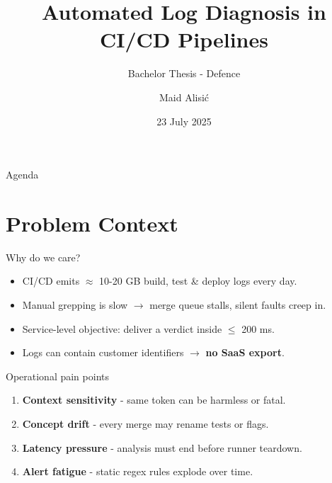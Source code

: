 \documentclass[14pt,aspectratio=169]{beamer}
\title{Automated Log Diagnosis in CI/CD Pipelines}
\subtitle{Bachelor Thesis - Defence}
\author{Maid Alisi\'c}
\institute{University of Applied Sciences Upper Austria}
\date{23 July 2025}
\begin{document}

\maketitle

\begin{frame}{Agenda}
\tableofcontents[
  hideallsubsections,
  sections={1,...,9}
]
\end{frame}

\section{Problem Context}
\begin{frame}{Why do we care?}
\begin{itemize}[<+->]
  \item CI/CD emits \alert{$\approx$ 10-20 GB} build, test \& deploy logs every day.
  \item Manual grepping is slow $\xrightarrow{}$ merge queue stalls, silent faults creep in.
  \item Service-level objective: deliver a verdict inside \alert{ $\leq$ 200 ms}.
  \item Logs can contain customer identifiers $\xrightarrow{}$ \textbf{no SaaS export}.
\end{itemize}
\end{frame}

\begin{frame}{Operational pain points}
\begin{enumerate}[<+->]
  \item \textbf{Context sensitivity} - same token can be harmless or fatal.
  \item \textbf{Concept drift} - every merge may rename tests or flags.
  \item \textbf{Latency pressure} - analysis must end before runner teardown.
  \item \textbf{Alert fatigue} - static regex rules explode over time.
\end{enumerate}
\end{frame}

\end{document}
